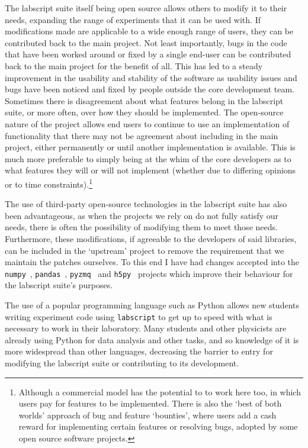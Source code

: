 The labscript suite itself being open source allows others to modify it to their needs, expanding the range of experiments that it can be used with. If modifications made are applicable to a wide enough range of users, they can be contributed back to the main project. Not least importantly, bugs in the code that have been worked around or fixed by a single end-user can be contributed back to the main project for the benefit of all. This has led to a steady improvement in the usability and stability of the software as usability issues and bugs have been noticed and fixed by people outside the core development team. Sometimes there is disagreement about what features belong in the labscript suite, or more often, over how they should be implemented. The open-source nature of the project allows end users to continue to use an implementation of functionality that there may not be agreement about including in the main project, either permanently or until another implementation is available. This is much more preferable to simply being at the whim of the core developers as to what features they will or will not implement (whether due to differing opinions or to time constraints).\footnote{Although a commercial model has the potential to to work here too, in which users pay for features to be implemented. There is also the `best of both worlds' approach of bug and feature `bounties', where users add a cash reward for implementing certain features or resolving bugs, adopted by some open source software projects.}

The use of third-party open-source technologies in the labscript suite has also been advantageous, as when the projects we rely on do not fully satisfy our needs, there is often the possibility of modifying them to meet those needs. Furthermore, these modifications, if agreeable to the developers of said libraries, can be included in the `upstream' project to remove the requirement that we maintain the patches ourselves. To this end I have had changes accepted into the \texttt{numpy}~\cite{oliphant_guide_2015}, \texttt{pandas}~\cite{mckinney-proc-scipy-2010}, \texttt{pyzmq}~\cite{brian_e._granger_and_contributors_pyzmq_2018} and \texttt{h5py}~\cite{andrew_collette_and_contributors_h5py_2018} projects which improve their behaviour for the labscript suite's purposes. 

The use of a popular programming language such as Python allows new students writing experiment code using \texttt{labscript} to get up to speed with what is necessary to work in their laboratory. Many students and other physicists are already using Python for data analysis and other tasks, and so knowledge of it is more widespread than other languages, decreasing the barrier to entry for modifying the labscript suite or contributing to its development.


